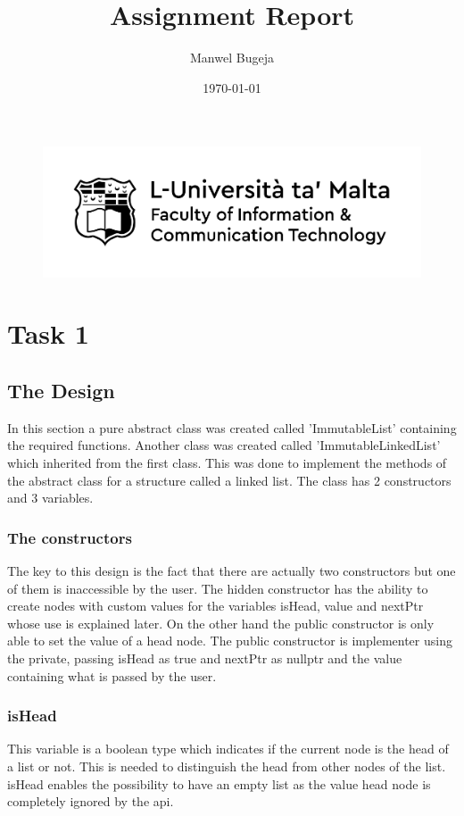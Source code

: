 \documentclass[a4paper, 12pt]{report}
\begin{document}
\begin{figure}
    \centering
    \includegraphics[width=1\textwidth]{Logo}
\end{figure}

\title{Assignment Report}
\author{Manwel Bugeja}
\date{\today}
\maketitle

\tableofcontents
\newpage

\section{Task 1}

\subsection{The Design}
In this section a pure abstract class was created called 'ImmutableList' containing the required functions.  Another class was created called 'ImmutableLinkedList' which inherited from the first class. This was done to implement the methods of the abstract class for a structure called a linked list. The class has 2 constructors and 3 variables.

\subsubsection{The constructors}
The key to this design is the fact that there are actually two constructors but one of them is inaccessible by the user. The hidden constructor has the ability to create nodes with custom values for the variables isHead, value and nextPtr whose use is explained later. On the other hand the public constructor is only able to set the value of a head node. The public constructor is implementer using the private, passing isHead as true and nextPtr as nullptr and the value containing what is passed by the user.

\subsubsection{isHead}
This variable is a boolean type which indicates if the current node is the head of a list or not. This is needed to distinguish the head from other nodes of the list.  isHead enables the possibility to have an empty list as the value head node is completely ignored by the api.
\end{document}
